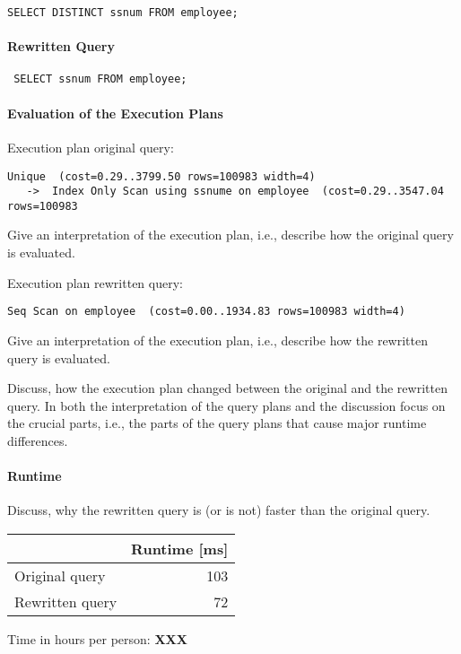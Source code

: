 \documentclass[11pt]{scrartcl}
\begin{document}
{\small
\begin{verbatim}
SELECT DISTINCT ssnum FROM employee;
\end{verbatim}
}

\paragraph{Rewritten Query}

{\small
\begin{verbatim}
 SELECT ssnum FROM employee;
\end{verbatim}
}

\paragraph{Evaluation of the Execution Plans}

Execution plan original query:

\begin{verbatim}
Unique  (cost=0.29..3799.50 rows=100983 width=4)
   ->  Index Only Scan using ssnume on employee  (cost=0.29..3547.04 rows=100983
\end{verbatim}

Give an interpretation of the execution plan, i.e., describe how the
original query is evaluated.

Execution plan rewritten query:

\begin{verbatim}
Seq Scan on employee  (cost=0.00..1934.83 rows=100983 width=4)
\end{verbatim}

Give an interpretation of the execution plan, i.e., describe how the
rewritten query is evaluated.

Discuss, how the execution plan changed between the original and the
rewritten query. In both the interpretation of the query plans and the
discussion focus on the crucial parts, i.e., the parts of the query
plans that cause major runtime differences.

\paragraph{Runtime} Discuss, why the rewritten query is (or is not)
faster than the original query.


\begin{table}[H]
  \begin{tabular}{l|r}
    & Runtime [ms] \\
   \hline
    Original query & 103 \\
    Rewritten query & 72 \\
  \end{tabular}
\end{table}


  Time in hours per person: {\bf XXX}
\end{document}
